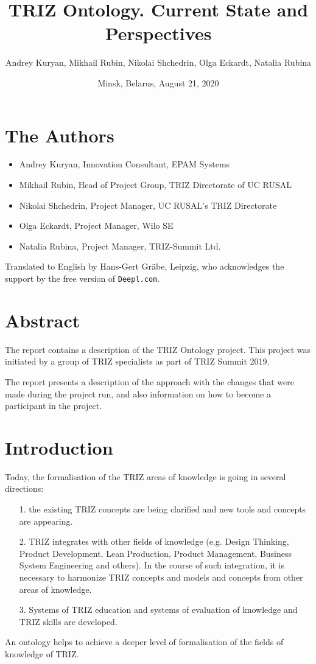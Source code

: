 \documentclass[11pt,a4paper]{article}
\title{TRIZ Ontology. Current State and Perspectives}
\author{Andrey Kuryan, Mikhail Rubin, Nikolai Shchedrin, Olga Eckardt, Natalia
  Rubina}
\date{Minsk, Belarus, August 21, 2020}
\begin{document}
\maketitle

\section{The Authors}

\begin{itemize}[noitemsep]
\item Andrey Kuryan, Innovation Consultant, EPAM Systems
\item Mikhail Rubin, Head of Project Group, TRIZ Directorate of UC RUSAL
\item Nikolai Shchedrin, Project Manager, UC RUSAL's TRIZ Directorate
\item Olga Eckardt, Project Manager, Wilo SE
\item Natalia Rubina, Project Manager, TRIZ-Summit Ltd.
\end{itemize}
Translated to English by Hans-Gert Gr\"abe, Leipzig, who acknowledges the
support by the free version of \texttt{Deepl.com}.

\section{Abstract}

The report contains a description of the TRIZ Ontology project. This project
was initiated by a group of TRIZ specialists as part of TRIZ Summit 2019.

The report presents a description of the approach with the changes that were
made during the project run, and also information on how to become a
participant in the project.  

\section{Introduction}

Today, the formalisation of the TRIZ areas of knowledge is going in several
directions:
\begin{itemize}
\item[1.] the existing TRIZ concepts are being clarified and new tools and
  concepts are appearing.
\item[2.] TRIZ integrates with other fields of knowledge (e.g. Design
  Thinking, Product Development, Lean Production, Product Management, Business
  System Engineering and others). In the course of such integration, it is
  necessary to harmonize TRIZ concepts and models and concepts from other
  areas of knowledge.
\item[3.] Systems of TRIZ education and systems of evaluation of knowledge and
  TRIZ skills are developed.
\end{itemize}
An ontology helps to achieve a deeper level of formalisation of the fields of
knowledge of TRIZ.
\end{document}
